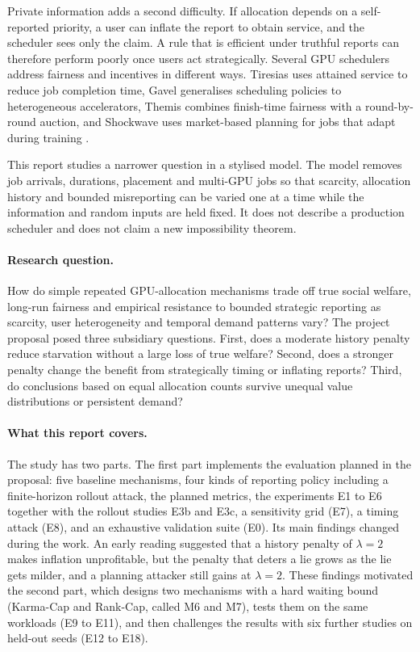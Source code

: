 \documentclass{article}
\theoremstyle{plain}
\theoremstyle{definition}
\begin{document}
Private information adds a second difficulty.
If allocation depends on a self-reported priority, a user can inflate the report to obtain service, and the scheduler sees only the claim.
A rule that is efficient under truthful reports can therefore perform poorly once users act strategically.
Several GPU schedulers address fairness and incentives in different ways.
Tiresias uses attained service to reduce job completion time, Gavel generalises scheduling policies to heterogeneous accelerators, Themis combines finish-time fairness with a round-by-round auction, and Shockwave uses market-based planning for jobs that adapt during training \cite{gu2019tiresias,narayanan2020gavel,mahajan2020themis,zheng2023shockwave}.

This report studies a narrower question in a stylised model.
The model removes job arrivals, durations, placement and multi-GPU jobs so that scarcity, allocation history and bounded misreporting can be varied one at a time while the information and random inputs are held fixed.
It does not describe a production scheduler and does not claim a new impossibility theorem.

\paragraph{Research question.}
How do simple repeated GPU-allocation mechanisms trade off true social welfare, long-run fairness and empirical resistance to bounded strategic reporting as scarcity, user heterogeneity and temporal demand patterns vary?
The project proposal posed three subsidiary questions.
First, does a moderate history penalty reduce starvation without a large loss of true welfare?
Second, does a stronger penalty change the benefit from strategically timing or inflating reports?
Third, do conclusions based on equal allocation counts survive unequal value distributions or persistent demand?

\paragraph{What this report covers.}
The study has two parts.
The first part implements the evaluation planned in the proposal: five baseline mechanisms, four kinds of reporting policy including a finite-horizon rollout attack, the planned metrics, the experiments E1 to E6 together with the rollout studies E3b and E3c, a sensitivity grid (E7), a timing attack (E8), and an exhaustive validation suite (E0).
Its main findings changed during the work.
An early reading suggested that a history penalty of $\lambda=2$ makes inflation unprofitable, but the penalty that deters a lie grows as the lie gets milder, and a planning attacker still gains at $\lambda=2$.
These findings motivated the second part, which designs two mechanisms with a hard waiting bound (Karma-Cap and Rank-Cap, called M6 and M7), tests them on the same workloads (E9 to E11), and then challenges the results with six further studies on held-out seeds (E12 to E18).
\end{document}
